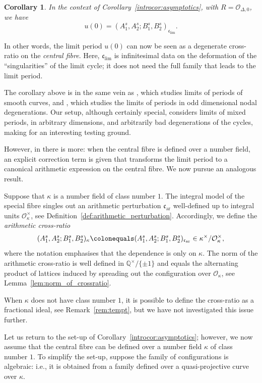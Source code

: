 \documentclass[11pt,a4paper]{amsart}
\newcommand{\Q}{\mathbb{Q}}
\newcommand{\xc}{\mathfrak{c}}
\theoremstyle{plain}
\newtheorem{corCprime}{Corollary}          %
\theoremstyle{definition}
\theoremstyle{remark}
\newcommand{\co}{\mathcal{O}}
\newcommand{\coleq}{\colonequals}
\newcommand{\xci}[1][]{\xc_{\mathrm{lim}#1}} %
\newcommand{\xca}[1][]{\xc_{\mathrm{ar}#1}} %
\begin{document}
\begin{corCprime}\label{introcor:limit}
  In the context of Corollary~\ref{introcor:asymptotics}, with $R=\co_{\Delta,0}$, we have
  \[
    u(0) = (A_1^s, A_2^s; B_1^s, B_2^s)_{\xci}.
  \]
\end{corCprime}

In other words, the limit period $u(0)$ can now be seen as a degenerate cross-ratio on the \emph{central fibre}. Here, $\xci$ is infinitesimal data on the deformation of the ``singularities'' of the limit cycle; it does not need the full family that leads to the limit period.

The corollary above is in the same vein as \cite[Main~Theorem]{BlochDeJongSertoz2023}, which studies limits of periods of smooth curves, and \cite{Beilinson2025}, which studies the limits of periods in odd dimensional nodal degenerations. Our setup, although certainly special, considers limits of mixed periods, in arbitrary dimensions, and arbitrarily bad degenerations of the cycles, making for an interesting testing ground.

However, in \cite[Main~Theorem]{BlochDeJongSertoz2023} there is more: when the central fibre is defined over a number field, an explicit correction term is given that transforms the limit period to a canonical arithmetic expression on the central fibre. We now pursue an analogous result.

\medskip

Suppose that $\kappa$ is a number field of class number $1$. The integral model of the special fibre singles out an arithmetic perturbation $\xca$ well-defined up to integral units $\co_\kappa^\times$, see Definition~\ref{def:arithmetic_perturbation}. Accordingly, we define the \emph{arithmetic cross-ratio}
\[
  (A_1^s, A_2^s; B_1^s, B_2^s)_\kappa \coleq (A_1^s, A_2^s; B_1^s, B_2^s)_{\xca} \in \kappa^\times/\co_\kappa^\times,
\]
where the notation emphasises that the dependence is only on $\kappa$. The norm of the arithmetic cross-ratio is well defined in $\Q^\times/\{\pm 1\}$ and equals the alternating product of lattices induced by spreading out the configuration over $\co_\kappa$, see Lemma~\ref{lem:norm_of_crossratio}. 

When $\kappa$ does not have class number $1$, it is possible to define the cross-ratio as a fractional ideal, see Remark~\ref{rem:tempt}, but we have not investigated this issue further.

\medskip

Let us return to the set-up of Corollary~\ref{introcor:asymptotics}; however, we now assume that the central fibre can be defined over a number field $\kappa$ of class number $1$. To simplify the set-up, suppose the family of configurations is algebraic: i.e., it is obtained from a family defined over a quasi-projective curve over $\kappa$. 
\end{document}
